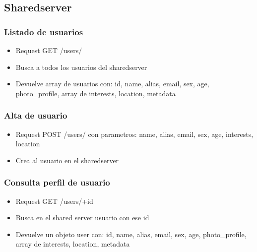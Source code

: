 \documentclass[letterpaper,10pt,english]{sphinxmanual}
\begin{document}
\subsection{Sharedserver}
\label{manuals:sharedserver}

\subsubsection{Listado de usuarios}
\label{manuals:listado-de-usuarios}\begin{itemize}
\item {} 
Request GET /users/

\item {} 
Busca a todos los usuarios del sharedserver

\item {} 
Devuelve array de usuarios con: id, name, alias, email, sex, age, photo\_profile, array de interests, location, metadata

\end{itemize}


\subsubsection{Alta de usuario}
\label{manuals:alta-de-usuario}\begin{itemize}
\item {} 
Request POST /users/ con parametros: name, alias, email, sex, age, interests, location

\item {} 
Crea al usuario  en el sharedserver

\end{itemize}


\subsubsection{Consulta perfil de usuario}
\label{manuals:consulta-perfil-de-usuario}\begin{itemize}
\item {} 
Request GET /users/+id

\item {} 
Busca en el shared server usuario con ese id

\item {} 
Devuelve un objeto user con: id, name, alias, email, sex, age, photo\_profile, array de interests, location, metadata

\end{itemize}
\end{document}
